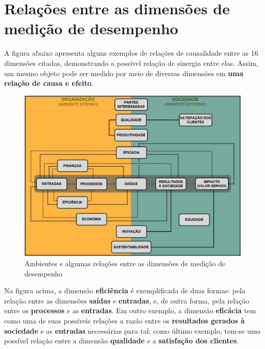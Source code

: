 \documentclass[
  letterpaper,
  DIV=11,
  numbers=noendperiod]{scrreprt}
\begin{document}
\hypertarget{relauxe7uxf5es-entre-as-dimensuxf5es-de-mediuxe7uxe3o-de-desempenho}{%
\section{Relações entre as dimensões de medição de
desempenho}\label{relauxe7uxf5es-entre-as-dimensuxf5es-de-mediuxe7uxe3o-de-desempenho}}

A figura abaixo apresenta alguns exemplos de relações de causalidade
entre as 16 dimensões citadas, demonstrando a possível relação de
sinergia entre elas. Assim, um mesmo objeto pode ser medido por meio de
diversas dimensões em \textbf{uma relação de causa e efeito}.

\begin{figure}

{\centering \includegraphics{images/relac_dimensoes.JPG}

}

\caption{Ambientes e algumas relações entre as dimensões de medição de
desempenho}

\end{figure}

Na figura acima, a dimensão \textbf{eficiência} é exemplificada de duas
formas: pela relação entre as dimensões \textbf{saídas} e
\textbf{entradas}, e, de outra forma, pela relação entre os
\textbf{processos} e as \textbf{entradas}. Em outro exemplo, a dimensão
\textbf{eficácia} tem como uma de suas possíveis relações a razão entre
os \textbf{resultados gerados à sociedade} e as \textbf{entradas}
necessárias para tal; como último exemplo, tem-se uma possível relação
entre a dimensão \textbf{qualidade} e a \textbf{satisfação dos
clientes}.
\end{document}
